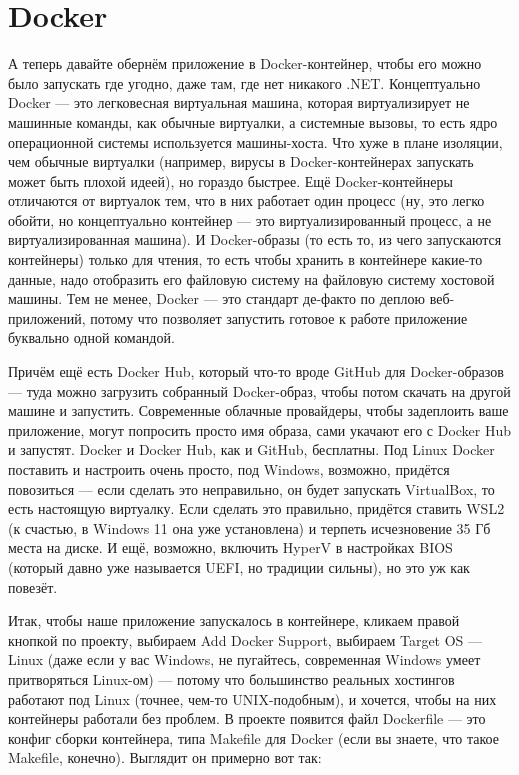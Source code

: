 \documentclass{../../text-style}
\begin{document}
\section{Docker}

А теперь давайте обернём приложение в Docker-контейнер, чтобы его можно было запускать где угодно, даже там, где нет никакого .NET. Концептуально Docker --- это легковесная виртуальная машина, которая виртуализирует не машинные команды, как обычные виртуалки, а системные вызовы, то есть ядро операционной системы используется машины-хоста. Что хуже в плане изоляции, чем обычные виртуалки (например, вирусы в Docker-контейнерах запускать может быть плохой идеей), но гораздо быстрее. Ещё Docker-контейнеры отличаются от виртуалок тем, что в них работает один процесс (ну, это легко обойти, но концептуально контейнер --- это виртуализированный процесс, а не виртуализированная машина). И Docker-образы (то есть то, из чего запускаются контейнеры) только для чтения, то есть чтобы хранить в контейнере какие-то данные, надо отобразить его файловую систему на файловую систему хостовой машины. Тем не менее, Docker --- это стандарт де-факто по деплою веб-приложений, потому что позволяет запустить готовое к работе приложение буквально одной командой. 

Причём ещё есть Docker Hub, который что-то вроде GitHub для Docker-образов --- туда можно загрузить собранный Docker-образ, чтобы потом скачать на другой машине и запустить. Современные облачные провайдеры, чтобы задеплоить ваше приложение, могут попросить просто имя образа, сами укачают его с Docker Hub и запустят. Docker и Docker Hub, как и GitHub, бесплатны. Под Linux Docker поставить и настроить очень просто, под Windows, возможно, придётся повозиться --- если сделать это неправильно, он будет запускать VirtualBox, то есть настоящую виртуалку. Если сделать это правильно, придётся ставить WSL2 (к счастью, в Windows 11 она уже установлена) и терпеть исчезновение 35 Гб места на диске. И ещё, возможно, включить HyperV в настройках BIOS (который давно уже называется UEFI, но традиции сильны), но это уж как повезёт.

Итак, чтобы наше приложение запускалось в контейнере, кликаем правой кнопкой по проекту, выбираем Add Docker Support, выбираем Target OS --- Linux (даже если у вас Windows, не пугайтесь, современная Windows умеет притворяться Linux-ом) --- потому что большинство реальных хостингов работают под Linux (точнее, чем-то UNIX-подобным), и хочется, чтобы на них контейнеры работали без проблем. В проекте появится файл Dockerfile --- это конфиг сборки контейнера, типа Makefile для Docker (если вы знаете, что такое Makefile, конечно). Выглядит он примерно вот так:
\end{document}
